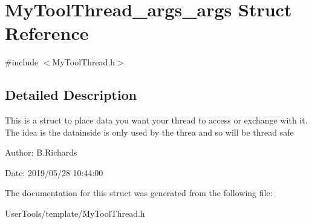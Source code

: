 \hypertarget{structMyToolThread__args__args}{\section{My\-Tool\-Thread\-\_\-args\-\_\-args Struct Reference}
\label{structMyToolThread__args__args}
}


{\ttfamily \#include $<$My\-Tool\-Thread.\-h$>$}



\subsection{Detailed Description}
This is a struct to place data you want your thread to access or exchange with it. The idea is the datainside is only used by the threa and so will be thread safe

\begin{DoxyParagraph}{Author\-:}
B.\-Richards 
\end{DoxyParagraph}
\begin{DoxyParagraph}{Date\-:}
2019/05/28 10\-:44\-:00 
\end{DoxyParagraph}


The documentation for this struct was generated from the following file\-:\begin{DoxyCompactItemize}
\item 
User\-Tools/template/My\-Tool\-Thread.\-h\end{DoxyCompactItemize}
